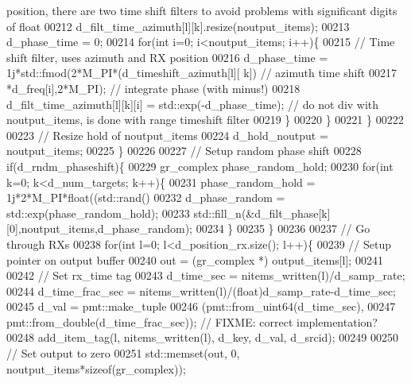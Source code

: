 \begin{DoxyCode}
{       position, there are two time shift filters to avoid problems with significant digits of float}
00212                     d_filt_time_azimuth[l][k].resize(noutput\_items);
00213                     d_phase_time = 0;
00214                     \textcolor{keywordflow}{for}(\textcolor{keywordtype}{int} i=0; i<noutput\_items; i++)\{
00215                         \textcolor{comment}{// Time shift filter, uses azimuth and RX position}
00216                         d_phase_time = 1j*std::fmod(2*M\_PI*(d_timeshift_azimuth[l][
      k]) \textcolor{comment}{// azimuth time shift}
00217                                 *d_freq[i],2*M\_PI); \textcolor{comment}{// integrate phase (with minus!)}
00218                         d_filt_time_azimuth[l][k][i] = std::exp(-d_phase_time); \textcolor{comment}{// do not div with
       noutput\_items, is done with range timeshift filter}
00219                     \}
00220                 \}
00221             \}
00222 
00223             \textcolor{comment}{// Resize hold of noutput\_items}
00224             d_hold_noutput = noutput\_items;
00225         \}
00226 
00227         \textcolor{comment}{// Setup random phase shift}
00228         \textcolor{keywordflow}{if}(d_rndm_phaseshift)\{
00229             gr\_complex phase\_random\_hold;
00230             \textcolor{keywordflow}{for}(\textcolor{keywordtype}{int} k=0; k<d_num_targets; k++)\{
00231                 phase\_random\_hold = 1j*2*M\_PI*float((std::rand()%
00232                 d_phase_random = std::exp(phase\_random\_hold);
00233                 std::fill\_n(&d_filt_phase[k][0],noutput\_items,d_phase_random);
00234             \}
00235         \}
00236 
00237         \textcolor{comment}{// Go through RXs}
00238         \textcolor{keywordflow}{for}(\textcolor{keywordtype}{int} l=0; l<d_position_rx.size(); l++)\{
00239             \textcolor{comment}{// Setup pointer on output buffer}
00240             out = (gr\_complex *) output\_items[l];
00241 
00242             \textcolor{comment}{// Set rx\_time tag}
00243             d_time_sec = nitems\_written(l)/d_samp_rate;
00244             d_time_frac_sec = nitems\_written(l)/(float)d_samp_rate-d_time_sec;
00245             d_val = pmt::make\_tuple
00246                 (pmt::from\_uint64(d_time_sec),
00247                  pmt::from\_double(d_time_frac_sec)); \textcolor{comment}{// FIXME: correct implementation?}
00248             add\_item\_tag(l, nitems\_written(l), d_key, d_val, d_srcid);
00249 
00250             \textcolor{comment}{// Set output to zero}
00251             std::memset(out, 0, noutput\_items*\textcolor{keyword}{sizeof}(gr\_complex));

\end{DoxyCode}
